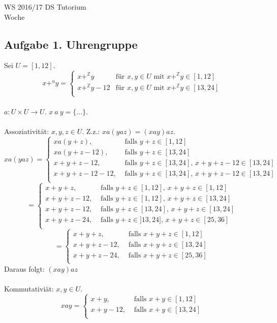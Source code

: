 \documentclass[a4paper,graphics,11pt]{article}
\newcommand\aufgabe[1]{\subsection*{Aufgabe #1}}
\begin{document}
\noindent WS 2016/17        							\hfill DS Tutorium \\
\noindent Woche                       

\aufgabe{1. Uhrengruppe}
Sei $U=[1,12]$.\\
\[ x+^{u}y = 
\begin{cases}  x+^{\mathbb{Z}}y & \text{f{\"u}r }x,y \in U \text{ mit } x+^{\mathbb{Z}}y \in [1,12]\\
				x+^{\mathbb{Z}}y-12 & \text{f{\"u}r }x,y \in U\text{ mit } x+^{\mathbb{Z}}y \in [13,24]\\\end{cases}
\] \\
$a:U \times U \to U$. $x~a~y=\{...\}$.\\ \\
Assoziativit{\"a}t: $x,y,z \in U$. Z.z.: $xa(yaz) = (xay)az$.
\[xa(yaz) = 
\begin{cases}	xa(y+z), &\text{ falls } y+z \in [1,12]\\
				xa(y+z-12), &\text{ falls } y+z \in [13,24]\\
				x+y+z-12, &\text{ falls } y+z \in [13,24]\text{, }x+y+z-12 \in [13,24]\\
				x+y+z-12-12, &\text{ falls } y+z \in [13,24] \text{, } x+y+z-12 \in [13,24]\\
\end{cases}
\]
\[ =
\begin{cases}	x+y+z, &\text{ falls }y+z \in [1,12] \text{, }x+y+z \in [1,12]\\
				x+y+z-12, &\text{ falls }y+z \in [1,12] \text{, } x+y+z \in [13,24]\\
				x+y+z-12, &\text{ falls }y+z \in [13,24] \text{, } x+y+z \in [13,24]\\
				x+y+z-24, &\text{ falls }y+z \in ]13,24] \text{, } x+y+z \in [25,36]\\
\end{cases}
\]
\[ =
\begin{cases}	x+y+z, &\text{ falls }x+y+z \in [1,12]\\
				x+y+z-12, &\text{ falls }x+y+z \in [13,24]\\
				x+y+z-24, &\text{ falls }x+y+z \in [25,36]\\
\end{cases}
\]
Daraus folgt: $(xay)az$\\ \\
Kommutativi{\"a}t: $x,y \in U$.
\[ xay =
\begin{cases}	x+y, &\text{ falls }x+y \in [1,12]\\
				x+y-12, &\text{ falls } x+y \in [13,24]\\
\end{cases}
\]
\end{document}
